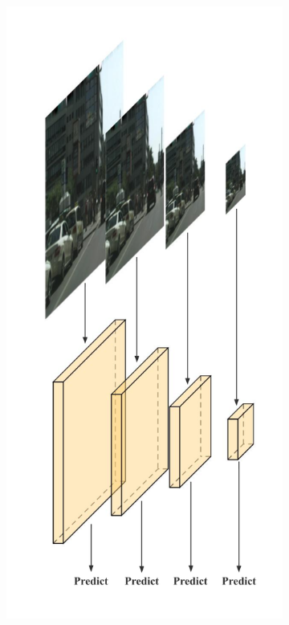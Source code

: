 \begin{figure}[htbp]
    \centering
    \begin{subfigure}[t]{0.3\linewidth}
        \includegraphics[width=1\textwidth]{figures/fcnarch1.png}

\end{subfigure}
\end{figure}
